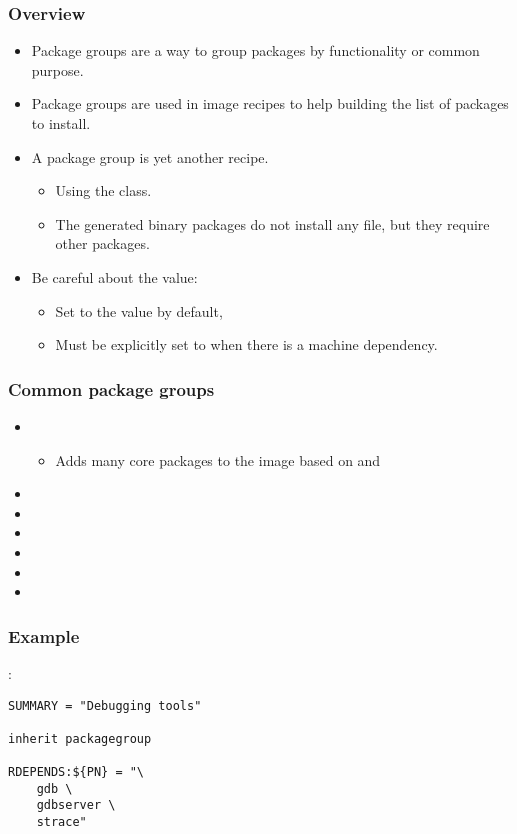 \begin{frame}
  \frametitle{Overview}
  \begin{itemize}
    \item Package groups are a way to group packages by functionality or
      common purpose.
    \item Package groups are used in image recipes to help building
      the list of packages to install.
    \item A package group is yet another recipe.
      \begin{itemize}
        \item Using the  class.
        \item The generated binary packages do not install any file, but
          they require other packages.
      \end{itemize}
    \item Be careful about the  value:
      \begin{itemize}
      \item Set to the value  by default,
      \item Must be explicitly set to  when there is a machine
        dependency.
      \end{itemize}
  \end{itemize}
\end{frame}

\begin{frame}
  \frametitle{Common package groups}
  \begin{itemize}
    \item {}
      \begin{itemize}
        \item Adds many core packages to the image based on
           and 
      \end{itemize}
    \item {}
    \item {}
    \item {}
    \item {}
    \item {}
    \item {}
  \end{itemize}
\end{frame}

\begin{frame}[fragile]
  \frametitle{Example}
  :
  \begin{block}{}
    \begin{verbatim}
SUMMARY = "Debugging tools"

inherit packagegroup

RDEPENDS:${PN} = "\
    gdb \
    gdbserver \
    strace"
    \end{verbatim}
  \end{block}
\end{frame}
